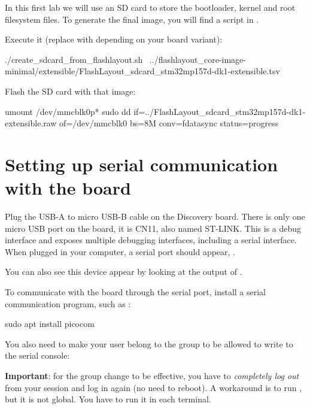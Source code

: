 In this first lab we will use an SD card to store the bootloader, kernel and
root filesystem files. To generate the final image, you will find a script in
.

Execute it (replace  with  depending on your board variant):
\begin{bashinput}
./create_sdcard_from_flashlayout.sh \
  ../flashlayout_core-image-minimal/extensible/FlashLayout_sdcard_stm32mp157d-dk1-extensible.tsv
\end{bashinput}

Flash the SD card with that image:
\begin{bashinput}
umount /dev/mmcblk0p*
sudo dd if=../FlashLayout_sdcard_stm32mp157d-dk1-extensible.raw of=/dev/mmcblk0 bs=8M conv=fdatasync status=progress
\end{bashinput}

\section{Setting up serial communication with the board}

Plug the USB-A to micro USB-B cable on the Discovery board. There is
only one micro USB port on the board, it is CN11, also named ST-LINK.
This is a debug interface and exposes multiple debugging interfaces,
including a serial interface. When plugged in your computer, a serial
port should appear, \code{/dev/ttyACM0}.

You can also see this device appear by looking at the output of
.

To communicate with the board through the serial port, install a
serial communication program, such as \code{picocom}:

\begin{bashinput}
sudo apt install picocom
\end{bashinput}

You also need to make your user belong to the  group to be
allowed to write to the serial console:


{\bf Important}: for the group change to be effective, you have to
{\em completely log out} from your session and log in again (no need to
reboot). A workaround is to run \code{newgrp dialout}, but it is not global.
You have to run it in each terminal.

